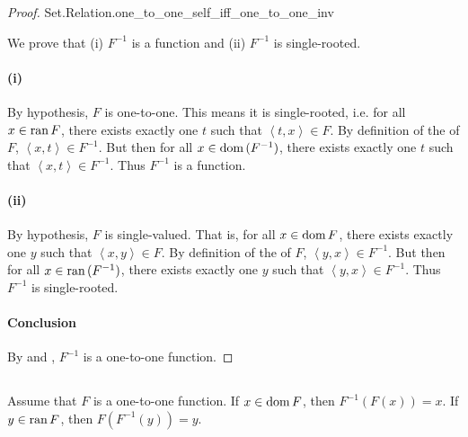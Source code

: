 \documentclass{report}
\newcommand{\pair}[1]{\left< #1 \right>}
\begin{document}
\begin{proof}

    {Set.Relation.one\_to\_one\_self\_iff\_one\_to\_one\_inv}

  We prove that (i) $F^{-1}$ is a function and (ii) $F^{-1}$ is single-rooted.

  \paragraph{(i)}%

    By hypothesis, $F$ is one-to-one.
    This means it is single-rooted, i.e. for all $x \in \mathop{\text{ran}}{F}$, there exists
      exactly one $t$ such that $\pair{t, x} \in F$.
    By definition of the  of $F$,
      $\pair{x, t} \in F^{-1}$.
    But then for all $x \in \mathop{\text{dom}}{(F^{-1})}$, there exists exactly one $t$ such
      that $\pair{x, t} \in F^{-1}$.
    Thus $F^{-1}$ is a function.

  \paragraph{(ii)}%

    By hypothesis, $F$ is single-valued.
    That is, for all $x \in \mathop{\text{dom}}{F}$, there exists exactly one $y$ such that
      $\pair{x, y} \in F$.
    By definition of the  of $F$,
      $\pair{y, x} \in F^{-1}$.
    But then for all $x \in \mathop{\text{ran}}{(F^{-1})}$, there exists exactly one $y$ such
      that $\pair{y, x} \in F^{-1}$.
    Thus $F^{-1}$ is single-rooted.

  \paragraph{Conclusion}%

    By  and , $F^{-1}$ is
      a one-to-one function.

\end{proof}

\subsection{}%

\begin{theorem}[3G]

  Assume that $F$ is a one-to-one function.
  If $x \in \mathop{\text{dom}}{F}$, then $F^{-1}(F(x)) = x$.
  If $y \in \mathop{\text{ran}}{F}$, then $F(F^{-1}(y)) = y$.

\end{theorem}
\end{document}
